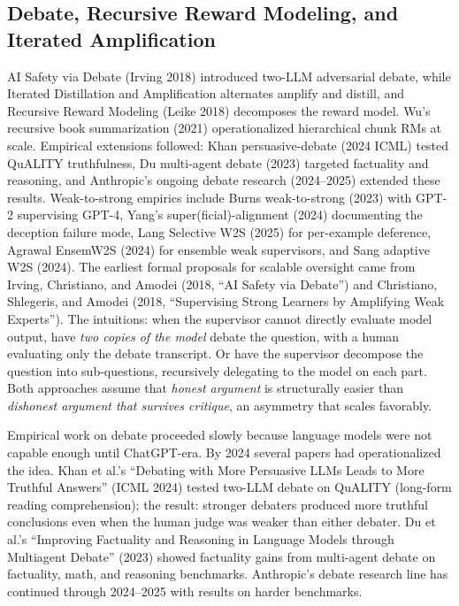 \documentclass{article}
\begin{document}
\subsection{Debate, Recursive Reward Modeling, and Iterated Amplification}\label{debate-recursive-reward-modeling-and-iterated-amplification}

AI Safety via Debate (Irving 2018) introduced two-LLM adversarial debate, while Iterated Distillation and Amplification \citep{christiano2017deepreinforcementl} alternates amplify and distill, and Recursive Reward Modeling (Leike 2018) decomposes the reward model. Wu's recursive book summarization (2021) operationalized hierarchical chunk RMs at scale. Empirical extensions followed: Khan persuasive-debate (2024 ICML) tested QuALITY truthfulness, Du multi-agent debate (2023) targeted factuality and reasoning, and Anthropic's ongoing debate research (2024--2025) extended these results. Weak-to-strong empirics include Burns weak-to-strong (2023) with GPT-2 supervising GPT-4, Yang's super(ficial)-alignment (2024) documenting the deception failure mode, Lang Selective W2S (2025) for per-example deference, Agrawal EnsemW2S (2024) for ensemble weak supervisors, and Sang adaptive W2S (2024). The earliest formal proposals for scalable oversight came from Irving, Christiano, and Amodei (2018, ``AI Safety via Debate'') and Christiano, Shlegeris, and Amodei (2018, ``Supervising Strong Learners by Amplifying Weak Experts''). The intuitions: when the supervisor cannot directly evaluate model output, have \emph{two copies of the model} debate the question, with a human evaluating only the debate transcript. Or have the supervisor decompose the question into sub-questions, recursively delegating to the model on each part. Both approaches assume that \emph{honest argument} is structurally easier than \emph{dishonest argument that survives critique}, an asymmetry that scales favorably.

Empirical work on debate proceeded slowly because language models were not capable enough until ChatGPT-era. By 2024 several papers had operationalized the idea. Khan et al.'s ``Debating with More Persuasive LLMs Leads to More Truthful Answers'' (ICML 2024) tested two-LLM debate on QuALITY (long-form reading comprehension); the result: stronger debaters produced more truthful conclusions even when the human judge was weaker than either debater. Du et al.'s ``Improving Factuality and Reasoning in Language Models through Multiagent Debate'' (2023) showed factuality gains from multi-agent debate on factuality, math, and reasoning benchmarks. Anthropic's debate research line has continued through 2024--2025 with results on harder benchmarks.
\end{document}
